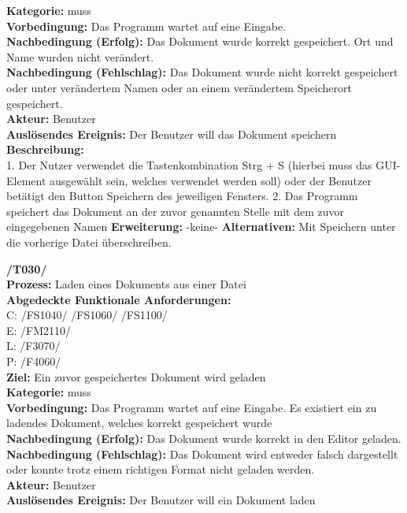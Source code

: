 \documentclass[a4paper]{scrreprt}
\begin{document}
\begin{addmargin}[15pt]{0pt}
\textbf{Kategorie:} muss\\
\textbf{Vorbedingung:} Das Programm wartet auf eine Eingabe.\\
\textbf{Nachbedingung (Erfolg):} Das Dokument wurde korrekt gespeichert. Ort und Name wurden nicht verändert.\\
\textbf{Nachbedingung (Fehlschlag):} Das Dokument wurde nicht korrekt gespeichert oder unter verändertem Namen oder an einem verändertem Speicherort gespeichert. \\
\textbf{Akteur:} Benutzer\\
\textbf{Auslösendes Ereignis:} Der Benutzer will das Dokument speichern\\
\textbf{Beschreibung:} \\
1. Der Nutzer verwendet die Tastenkombination Strg + S (hierbei muss das GUI-Element ausgewählt sein, welches verwendet werden soll) oder der Benutzer betätigt den Button Speichern des jeweiligen Fensters.
2. Das Programm speichert das Dokument an der zuvor genannten Stelle mit dem zuvor eingegebenen Namen
\textbf {Erweiterung:} -keine-
\textbf {Alternativen:} Mit Speichern unter die vorherige Datei überschreiben. \\
\end{addmargin}
\textbf{/T030/} \\
\textbf{Prozess: }Laden eines Dokuments aus einer Datei \\
\textbf{Abgedeckte Funktionale Anforderungen:} \\
C: /FS1040/ /FS1060/ /FS1100/\\
E: /FM2110/	\\
L: /F3070/ \\
P: /F4060/\\
\textbf{Ziel:} Ein zuvor gespeichertes Dokument wird geladen\\
\textbf{Kategorie:} muss\\
\textbf{Vorbedingung:} Das Programm wartet auf eine Eingabe. Es existiert ein zu ladendes Dokument, welches korrekt gespeichert wurde\\
\textbf{Nachbedingung (Erfolg):} Das Dokument wurde korrekt in den Editor geladen. \\
\textbf{Nachbedingung (Fehlschlag):} Das Dokument wird entweder falsch dargestellt oder konnte trotz einem richtigen Format nicht geladen werden. \\ 
\textbf{Akteur:} Benutzer\\
\textbf{Auslösendes Ereignis:} Der Benutzer will ein Dokument laden \\
\end{document}
